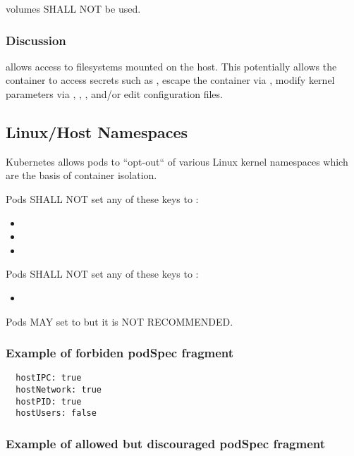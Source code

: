 \documentclass[PMO,authoryear,toc]{lsstdoc}
\begin{document}
 volumes SHALL NOT be used.

\subsubsection{Discussion}

 allows access to filesystems mounted on the host. This potentially allows the container to access secrets such as , escape the container via , modify kernel parameters via , , , and/or edit configuration files.

\subsection{Linux/Host Namespaces}\label{sec:hostns}

Kubernetes allows pods to ``opt-out`` of various Linux kernel namespaces which are the basis of container isolation.

Pods SHALL NOT set any of these  keys to :

\begin{itemize}
  \item {}
  \item {}
  \item {}
\end{itemize}

Pods SHALL NOT set any of these  keys to :

\begin{itemize}
  \item {}
\end{itemize}

Pods MAY set  to  but it is NOT RECOMMENDED.

\subsubsection{Example of forbiden podSpec fragment}

\begin{verbatim}
  hostIPC: true
  hostNetwork: true
  hostPID: true
  hostUsers: false
\end{verbatim}

\subsubsection{Example of allowed but discouraged podSpec fragment}
\end{document}
